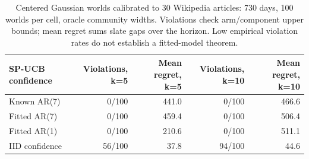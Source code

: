 \begin{table}[!htbp]\centering\small
\begin{lrbox}{\latestTableBox}
\begin{tabular}{lrrrr}
\toprule
SP-UCB confidence & Violations, k=5 & Mean regret, k=5 & Violations, k=10 & Mean regret, k=10 \\
\midrule
Known AR(7) & 0/100 & 441.0 & 0/100 & 466.6 \\
Fitted AR(7) & 0/100 & 459.4 & 0/100 & 506.4 \\
Fitted AR(1) & 0/100 & 210.6 & 0/100 & 511.1 \\
IID confidence & 56/100 & 37.8 & 94/100 & 44.6 \\
\bottomrule
\end{tabular}\end{lrbox}
\ifdim\wd\latestTableBox>\linewidth\resizebox{\linewidth}{!}{\usebox{\latestTableBox}}\else\usebox{\latestTableBox}\fi
\caption{Centered Gaussian worlds calibrated to 30 Wikipedia articles: 730 days, 100 worlds per cell, oracle community widths. Violations check arm/component upper bounds; mean regret sums slate gaps over the horizon. Low empirical violation rates do not establish a fitted-model theorem.}
\label{tab:latest-realcert}
\end{table}
